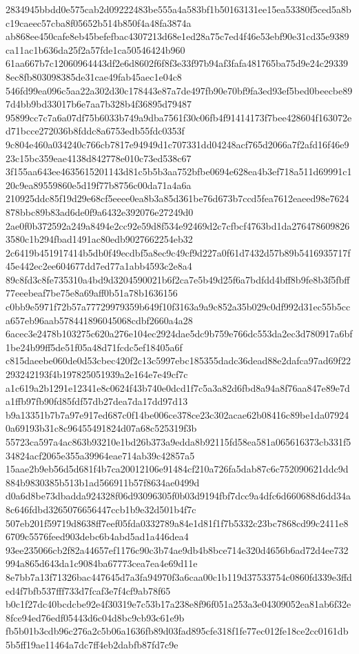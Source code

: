 \documentclass[11pt,a4paper]{article}
\begin{document}
{2834945bbdd0e575cab2d09222483be555a4a583bf1b50163131ee15ea53380f5ced5a8bc19caeec57cba8f05652b514b850f4a48fa3874a
ab868ee450cafe8eb45befefbac4307213d68e1ed28a75c7ed4f46e53ebf90e31cd35e9389ca11ac1b636da25f2a57fde1ca50546424b960
61aa667b7c12060964443df2e6d8602f6f8f3e33f97b94af3fafa481765ba75d9e24c293398ec8fb803098385de31cae49fab45aec1e04c8
546fd99ea096c5aa22a302d30c178443e87a7de497fb90e70bf9fa3ed93ef5bed0beecbe897d4bb9bd33017b6e7aa7b328b4f36895d79487
95899cc7c7a6a07df75b6033b749a9dba7561f30c06fb4f91414173f7bee428604f163072ed71bcce272036b8fddc8a6753edb55fdc0353f
9c804e460a034240c766cb7817e94949d1c707331dd04248acf765d2066a7f2afd16f46e923c15bc359eae4138d842778e010c73ed538c67
3f155aa643ee4635615201143d81c5b5b3aa752bfbe0694e628ea4b3ef718a511d69991c120c9ea89559860e5d19f77b8756c00da71a4a6a
210925ddc85f19d29e68cf5eeee0ea8b3a85d361be76d673b7ccd5fea7612eaeed98e7624878bbc89b83ad6de0f9a6432e392076e27249d0
2ae0f0b372592a249a8494e2cc92e59d8f534e92469d2c7cfbcf4763bd1da2764786098263580c1b294fbad1491ac80edb9027662254eb32
2c6419b451917414b5db0f49ecdbf5a8ec9c49cf9d227a0f61d7432d57b89b5416935717f45e442ec2ee604677dd7ed77a1abb4593c2e8a4
89c8fd3c8fe735310a4bd9d3204590021b6f2ca7e5b49d25f6a7bdfdd4bff8b9fe8b3f5fbff77eeebeaf7be75e8a69aff0b51a78b1636156
c0bb9e5971f72b57a77729979359b649f10f3163a9a9c852a35b029c0df992d31ec55b5cca657eb96aab578441896045068cdbf2660a4a28
6acec3e2478b103275c620a276e104ec2924dae5dc9b759e766dc553da2ec3d780917a6bf1be24b99ff5de51f05a48d71fcdc5ef18405a6f
c815daeebe060de0d53cbec420f2c13c5997ebc185355dadc36dead88e2dafca97ad69f22293242193f4b197825051939a2e164e7e49cf7c
a1c619a2b1291e12341e8c0624f43b740e0dcd1f7c5a3a82d6fbd8a94a8f76aa847e89e7da1ffb97fb90fd85fdf57db27dea7da17dd97d13
b9a13351b7b7a97e917ed687c0f14be006ce378ce23c302acae62b08416c89be1da079240a69193b31c8c96455491824d07a68c525319f3b
55723ca597a4ac863b93210e1bd26b373a9edda8b92115fd58ea581a065616373cb331f534824acf2065e355a39964eae714ab39c42857a5
15aae2b9eb56d5d681f4b7ca20012106e91484cf210a726fa5dab87c6c752090621ddc9d884b9830385b513b1ad566911b57f8634ae0499d
d0a6d8be73dbadda924328f06d93096305f0b03d9194fbf7dcc9a4dfc6d660688d6dd34a8c646fdbd3265076656447ccb1b9e32d501b4f7c
507eb201f59719d8638ff7eef05fda0332789a84e1d81f1f7b5332c23bc7868cd99c2411e86709c5576feed903debc6b4abd5ad1a446dea4
93ee235066cb2f82a44657ef1176c90c3b74ae9db4b8bce714e320d4656b6ad72d4ee732994a865d643da1c9084ba67773cea7ea4e69d11e
8e7bb7a13f71326bac447645d7a3fa94970f3a6caa00c1b119d37533754c0860fd339e3ffded4f7bfb537fff733d7fcaf3e7f4cf9ab78f65
b0c1f27dc40bcdcbe92e4f30319e7c53b17a238e8f96f051a253a3e04309052ea81ab6f32e8fce94ed76edf05443d6c04d8bc9cb93c61e9b
fb5b01b3cdb96c276a2c5b06a1636fb89d03fad895cfe318f1fe77ec012fe18ce2cc0161db5b5ff19ae11464a7dc7ff4eb2dabfb87fd7c9e
}
\end{document}
